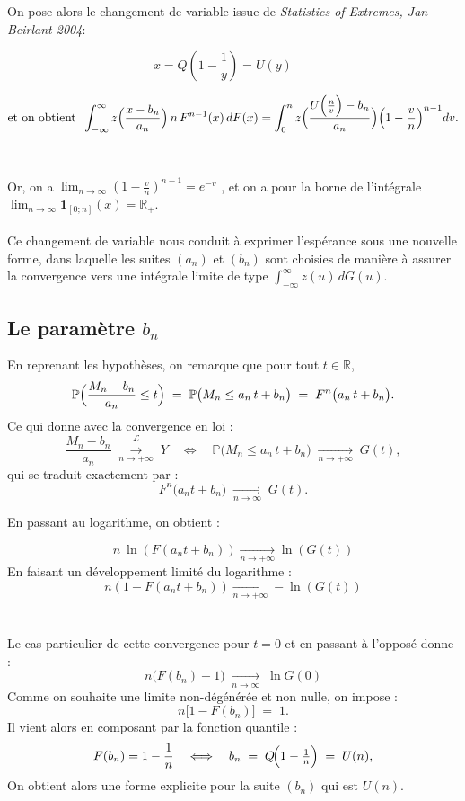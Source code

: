 \documentclass{article}
\theoremstyle{plain}
\theoremstyle{definition}
\theoremstyle{plain}
\begin{document}
\noindent On pose alors le changement de variable issue de \textit{Statistics of Extremes, Jan Beirlant 2004}: 

\[
x = Q(1-\frac{1}{y}) = U(y) \; \; \; \; \; \; 
\]

\begin{equation}\label{eq:1.1}
    \text{et on obtient} \; \; \int_{-\infty}^{\infty} z\Bigl(\frac{x-b_n}{a_n}\Bigr) \, n \, F^{n-1}(x)\,dF(x)
    =\int_{0}^{n} z\Bigl(\frac{U\Bigl(\frac{n}{v}\Bigr)-b_n}{a_n}\Bigr)
    \Bigl(1-\frac{v}{n}\Bigr)^{n-1}dv.
\end{equation}
\\
\\
Or, on a $\lim_{n \to \infty} ( 1 - \frac{v}{n})^{n-1} = e^{-v}$ , et on a pour la borne de l'intégrale $\lim_{n \to \infty} \mathbf{1}_{[0;n]}(x) = \mathbb{R}_{+}$.
\\
\\
Ce changement de variable nous conduit à exprimer l’espérance sous une nouvelle forme, dans laquelle les suites $(a_n)$ et $(b_n)$ sont choisies de manière à assurer la convergence vers une intégrale limite de type $\int_{-\infty}^{\infty} z(u)\, dG(u)$.


\subsection{Le paramètre $b_n$}

\noindent En reprenant les hypothèses, on remarque que pour tout $t\in\mathbb R$,
\[
\mathbb{P}  \Bigl(\frac{M_n - b_n}{a_n} \le t\Bigr)
\;=\;
\mathbb{P} \bigl(M_n \le a_n\,t + b_n\bigr)
\;=\;
F^{n}\bigl(a_n\,t + b_n\bigr).
\]
Ce qui donne avec la convergence en loi :
\[
\frac{M_n - b_n}{a_n}\;\overset{\mathcal{L}}{\xrightarrow[n\to +\infty]{}}\;Y
\quad\Longleftrightarrow\quad
\mathbb{P} \bigl(M_n \le a_n\,t + b_n\bigr)
\;\xrightarrow[n\to +\infty]{} \; G(t),
\]
qui se traduit exactement par :
\[
F^{n} \bigl(a_n t + b_n\bigr)
\;\xrightarrow[n\to\infty]{}\;
G(t).
\]

\noindent En passant au logarithme, on obtient :

\[
n \: \ln (F(a_n t + b_n)) \xrightarrow[n\to +\infty]{} \ln (G(t))
\]
En faisant un développement limité du logarithme :
\[
n(1 - F(a_n t + b_n)) \xrightarrow[n\to +\infty]{} - \ln (G(t))
\]
\\
\\
Le cas particulier de cette convergence pour $t=0$ et en passant à l'opposé donne :
\[
n\bigl(F(b_n)-1\bigr)\;\xrightarrow[n\to\infty]{}\; \ln G(0)
\]
Comme on souhaite une limite non-dégénérée et non nulle, on impose :
\[
n\bigl[1 - F(b_n)\bigr] \;=\; 1.
\]
Il vient alors en composant par la fonction quantile :
\[
F(b_n)=1-\frac1n
\quad\Longleftrightarrow\quad
b_n \;=\; Q\!\Bigl(1-\tfrac1n\Bigr)
\;=\;U(n),
\]
 On obtient alors une forme explicite pour la suite $(b_n)$ qui est $U(n)$.
\end{document}
